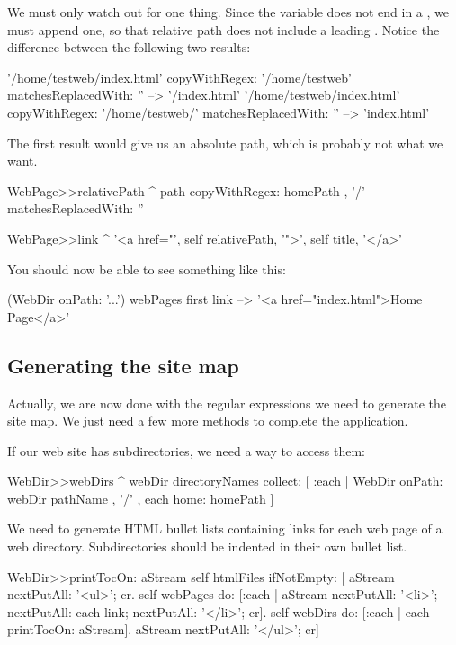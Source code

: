 \documentclass[a4paper,10pt,twoside]{book}
\begin{document}
We must only watch out for one thing.  Since the  variable does not end in a \ct{/}, we must append one, so that relative path does not include a leading \ct{/}. Notice the difference between the following two results:

\begin{code}{}
'/home/testweb/index.html' copyWithRegex: '/home/testweb' matchesReplacedWith: '' --> '/index.html'
'/home/testweb/index.html' copyWithRegex: '/home/testweb/' matchesReplacedWith: '' -->  'index.html'
\end{code}

The first result would give us an absolute path, which is probably not what we want.


\begin{code}{}
WebPage>>relativePath
	^ path 
		copyWithRegex: homePath , '/'
		matchesReplacedWith: ''

WebPage>>link
	^ '<a href="', self relativePath, '">', self title, '</a>'
\end{code}

You should now be able to see something like this:

\begin{code}{}
(WebDir onPath: '...') webPages first link --> '<a href="index.html">Home Page</a>'
\end{code}

\subsection{Generating the site map}

Actually, we are now done with the regular expressions we need to generate the site map.  We just need a few more methods to complete the application.


If our web site has subdirectories, we need a way to access them:
\begin{code}{}
WebDir>>webDirs
	^ webDir directoryNames
		collect: [ :each | WebDir onPath: webDir pathName , '/' , each home: homePath ]
\end{code}

We need to generate HTML bullet lists containing links for each web page of a web directory.
Subdirectories should be indented in their own bullet list.
\begin{code}{}
WebDir>>printTocOn: aStream 
	self htmlFiles
		ifNotEmpty: [
			aStream nextPutAll: '<ul>'; cr.
			self webPages
				do: [:each | aStream nextPutAll: '<li>';
						 nextPutAll: each link;
						 nextPutAll: '</li>'; cr].
			self webDirs
				do: [:each | each printTocOn: aStream].
			aStream nextPutAll: '</ul>'; cr]
\end{code}
\end{document}
